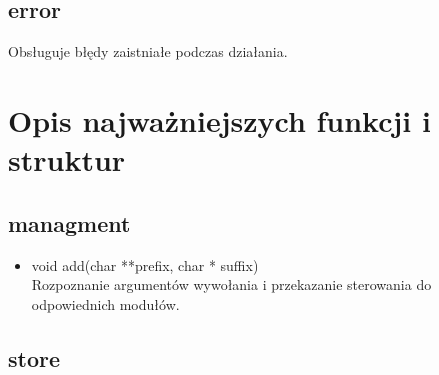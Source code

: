 \documentclass[12pt,a4paper]{report}
\begin{document}
	\subsection*{error} Obsługuje błędy zaistniałe podczas działania.
	
\section*{Opis najważniejszych funkcji i struktur} 

	\subsection*{managment}
	
		\begin{itemize}
			
			\item void add(char **prefix, char * suffix) \\
			Rozpoznanie argumentów wywołania i przekazanie sterowania do odpowiednich modułów.
			
		\end{itemize}
	
	\subsection*{store} 
	
\end{document}

